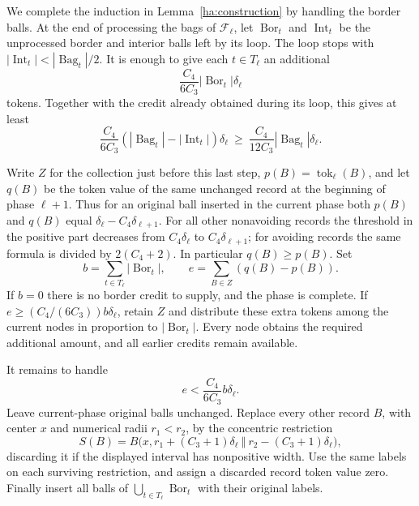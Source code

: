 \documentclass[11pt]{amsart}
\theoremstyle{definition}
\theoremstyle{remark}
\numberwithin{equation}{section}
\begin{document}
We complete the induction in Lemma~\ref{ha:construction} by handling
the border balls.  At the end of processing the bags of
$\mathcal F_\ell$, let $\operatorname{Bor}_t$ and
$\operatorname{Int}_t$ be the unprocessed border and interior balls
left by its loop.  The loop stops with
$|\operatorname{Int}_t|<|\operatorname{Bag}_t|/2$.
It is enough to give each $t\in T_\ell$ an additional
\[
 \frac{C_4}{6C_3}|\operatorname{Bor}_t|\delta_\ell
\]
tokens.  Together with the credit already obtained during its loop,
this gives at least
\begin{equation}\label{ha:phase-target}
 \frac{C_4}{6C_3}
 (|\operatorname{Bag}_t|-|\operatorname{Int}_t|)\delta_\ell
 \ \ge\ \frac{C_4}{12C_3}|\operatorname{Bag}_t|\delta_\ell.
\end{equation}

Write $Z$ for the collection just before this last step,
$p(B)=\operatorname{tok}_\ell(B)$, and let $q(B)$ be the token
value of the same unchanged record at the beginning of phase
$\ell+1$.  Thus for an original ball inserted in the current phase
both $p(B)$ and $q(B)$ equal $\delta_\ell-C_4\delta_{\ell+1}$.
For all other nonavoiding records the threshold in the positive
part decreases from $C_4\delta_\ell$ to $C_4\delta_{\ell+1}$;
for avoiding records the same formula is divided by $2(C_4+2)$.
In particular $q(B)\ge p(B)$.
Set
\[
 b=\sum_{t\in T_\ell}|\operatorname{Bor}_t|,
 \qquad e=\sum_{B\in Z}(q(B)-p(B)).
\]
If $b=0$ there is no border credit to supply, and the phase is
complete.  If $e\ge (C_4/(6C_3))b\delta_\ell$, retain $Z$ and
distribute these extra tokens among the current nodes in proportion
to $|\operatorname{Bor}_t|$.  Every node obtains the required
additional amount, and all earlier credits remain available.

It remains to handle
\begin{equation}\label{ha:small-excess}
 e<\frac{C_4}{6C_3}b\delta_\ell.
\end{equation}
Leave current-phase original balls unchanged.  Replace every other
record $B$, with center $x$ and numerical radii $r_1<r_2$, by the
concentric restriction
\[
 S(B)=B\bigl(x,r_1+(C_3+1)\delta_\ell\ \Vert\
                    r_2-(C_3+1)\delta_\ell\bigr),
\]
discarding it if the displayed interval has nonpositive width.
Use the same labels on each surviving restriction, and assign a
discarded record token value zero.  Finally insert all balls of
$\bigcup_{t\in T_\ell}\operatorname{Bor}_t$ with their original
labels.
\end{document}
